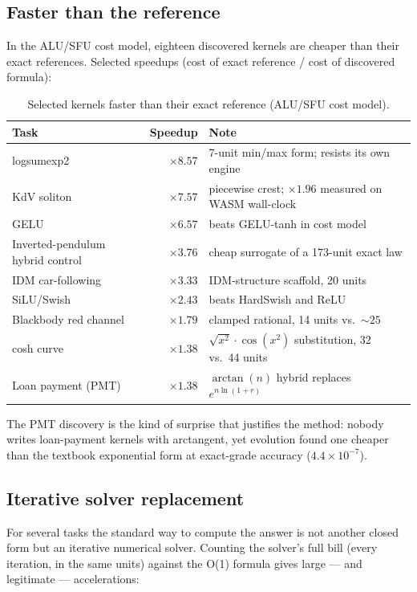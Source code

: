 \documentclass[11pt]{article}
\begin{document}
\subsection{Faster than the reference}
In the ALU/SFU cost model, eighteen discovered kernels are cheaper than their exact references. Selected speedups (cost of exact reference / cost of discovered formula):

\begin{table}[h]
\centering
\caption{Selected kernels faster than their exact reference (ALU/SFU cost model).}
\label{tab:faster}
\begin{tabular}{@{}lrl@{}}
\toprule
Task & Speedup & Note \\
\midrule
logsumexp2 & $\times8.57$ & 7-unit min/max form; resists its own engine \\
KdV soliton & $\times7.57$ & piecewise crest; $\times1.96$ measured on WASM wall-clock \\
GELU & $\times6.57$ & beats GELU-tanh in cost model \\
Inverted-pendulum hybrid control & $\times3.76$ & cheap surrogate of a 173-unit exact law \\
IDM car-following & $\times3.33$ & IDM-structure scaffold, 20 units \\
SiLU/Swish & $\times2.43$ & beats HardSwish and ReLU \\
Blackbody red channel & $\times1.79$ & clamped rational, 14 units vs.\ ${\sim}25$ \\
cosh curve & $\times1.38$ & $\sqrt{x^2}\cdot\cos(x^2)$ substitution, 32 vs.\ 44 units \\
Loan payment (PMT) & $\times1.38$ & $\arctan(n)$ hybrid replaces $e^{n\ln(1+r)}$ \\
\bottomrule
\end{tabular}
\end{table}

The PMT discovery is the kind of surprise that justifies the method: nobody writes loan-payment kernels with arctangent, yet evolution found one cheaper than the textbook exponential form at exact-grade accuracy ($4.4\times10^{-7}$).

\subsection{Iterative solver replacement}
\label{sec:iterative}
For several tasks the standard way to compute the answer is not another closed form but an iterative numerical solver. Counting the solver's full bill (every iteration, in the same units) against the O(1) formula gives large --- and legitimate --- accelerations:
\end{document}
